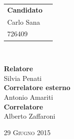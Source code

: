 \begin{titlepage}
 \vspace{8.7cm}

\vspace{1cm}
\begin{minipage}{0.4\textwidth}
\begin{flushleft} \large
\begin{tabular}{l r }
\textbf{Candidato} \\

\textsf{Carlo Sana}  &
\\
\textsf{726409} & 

\end{tabular}

\end{flushleft}

\vfill
\end{minipage}
~
\begin{minipage}{0.4\textwidth}
\begin{flushright} \large
\vspace{2cm}
\textbf{Relatore} \\
\textsf{Silvia Penati}
\\[0.3cm]
\textbf{Correlatore esterno} \\
\textsf{Antonio Amariti}
\\[0.3cm]
\textbf{Correlatore}\\
\textsf{Alberto Zaffaroni}
\end{flushright}
\end{minipage}

\vfill


{\large \textsc{29 Giugno 2015}}


 
%

\end{titlepage}

\restoregeometry